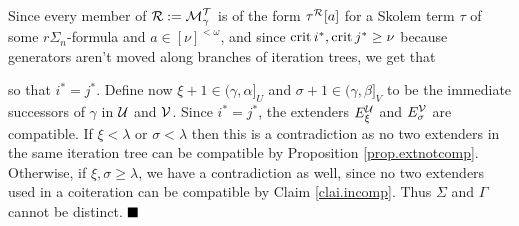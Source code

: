 {\qquad Since every member of $\operatorname{\mathcal{R}}:=\operatorname{\mathcal{M}}_\gamma^{\operatorname{\mathcal{T}}}$ is of the form $\tau^{\operatorname{\mathcal{R}}}[a]$ for a Skolem term $\tau$ of some $r\Sigma_n$-formula and $a\in[\nu]^{<\omega}$, and since $\operatorname{crit} i^*,\operatorname{crit} j^*\geq\nu$ because generators aren't moved along branches of iteration trees, we get that

so that $i^*=j^*$. Define now $\xi+1\in(\gamma,\alpha]_U$ and $\sigma+1\in(\gamma,\beta]_V$ to be the immediate successors of $\gamma$ in $\operatorname{\mathcal{U}}$ and $\operatorname{\mathcal{V}}$. Since $i^*=j^*$, the extenders $E_\xi^{\operatorname{\mathcal{U}}}$ and $E_\sigma^{\operatorname{\mathcal{V}}}$ are compatible. If $\xi<\lambda$ or $\sigma<\lambda$ then this is a contradiction as no two extenders in the same iteration tree can be compatible by Proposition \ref{prop.extnotcomp}. Otherwise, if $\xi,\sigma\geq\lambda$, we have a contradiction as well, since no two extenders used in a coiteration can be compatible by Claim \ref{clai.incomp}. Thus $\Sigma$ and $\Gamma$ cannot be distinct.
$\qed$}
